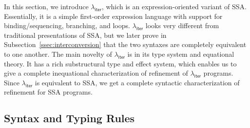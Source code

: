 \documentclass[acmsmall,screen,review]{acmart}
\newcommand{\ms}[1]{\ensuremath{\mathsf{#1}}}
\newcommand{\subiterexp}{\texorpdfstring{\(\lambda_{\ms{iter}}\)}{lambda-iter}}
\begin{document}
In this section, we introduce \subiterexp{}, which is an expression-oriented variant of SSA.
Essentially, it is a simple first-order expression language with support for binding/sequencing,
branching, and loops. \subiterexp{} looks very different from traditional presentations of SSA, but
we later prove in Subsection~\ref{ssec:interconversion} that the two syntaxes are completely
equivalent to one another. The main novelty of \subiterexp{} is in its type system and equational theory.
It has a rich substructural type and effect system, which enables us to give a complete inequational
characterization of refinement of \subiterexp{} programs. Since \subiterexp{} is equivalent
to SSA, we get a complete syntactic characterization of refinement for SSA programs. 

% 
% 
\subsection{Syntax and Typing Rules}
\end{document}
